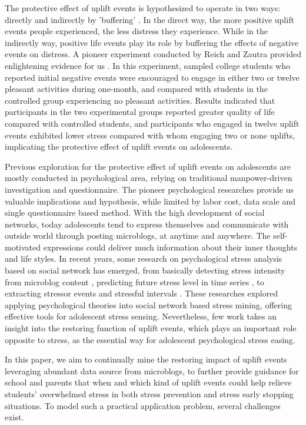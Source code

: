 The protective effect of uplift events is hypothesized to operate in two ways:
directly and indirectly by 'buffering' \cite{Cohen2010Positive}.
In the direct way,
the more positive uplift events people experienced, the less distress they experience.
While in the indirectly way, positive life events play its role by buffering the effects of negative events on distress.
A pioneer experiment conducted by Reich and Zautra provided enlightening evidence for us \cite{Shahar2002Positive}.
In this experiment, sampled college students who reported initial negative events were encouraged to engage in either two or twelve pleasant activities during one-month, and compared with students in the controlled group experiencing no pleasant activities.
Results indicated that participants in the two experimental groups reported greater quality of life compared with controlled students,
and participants who engaged in twelve uplift events exhibited lower stress compared with whom engaging two or none uplifts,
implicating the protective effect of uplift events on adolescents.

Previous exploration for the protective effect of uplift events on adolescents are mostly conducted in psychological area,
relying on traditional manpower-driven investigation and questionnaire.
The pioneer psychological researches provide us valuable implications and hypothesis,
while limited by labor cost, data scale and single questionnaire based method.
With the high development of social networks,
today adolescents tend to express themselves and communicate with outside world through posting microblogs,
at anytime and anywhere.
The self-motivated expressions could deliver much information about their inner thoughts and life styles.
In recent years, some research on psychological stress analysis based on social network has emerged,
from basically detecting stress intensity from microblog content
\cite{XueUbicomp13,Xue2014Detecting}, predicting future stress level in time series
\cite{Li2015Predicting,Li2015When,Li2015Using,Li2017Exploring},
to extracting stressor events and stressful intervals \cite{Li2017Analyzing}.
These researches explored applying psychological theories into social network based stress mining,
offering effective tools for adolescent stress sensing.
Nevertheless, few work takes an insight into the restoring function of uplift events,
which plays an important role opposite to stress,
as the essential way for adolescent psychological stress easing.

In this paper,
we aim to continually mine the restoring impact of uplift events leveraging abundant data source from microblogs,
to further provide guidance for school and parents that when and which kind of uplift events could help relieve students' overwhelmed stress in both stress prevention and stress early stopping situations.
To model such a practical application problem, several challenges exist.

